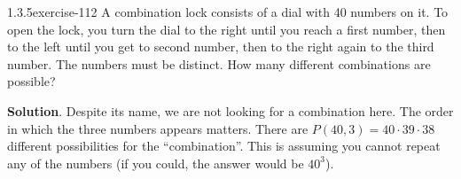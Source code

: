 \documentclass[twoside,11pt,]{book}
\numberwithin{equation}{chapter}
\begin{document}
\begin{divisionsolution}{1.3.5}{}{exercise-112}%
\hypertarget{p-1845}{}%
A combination lock consists of a dial with 40 numbers on it. To open the lock, you turn the dial to the right until you reach a first number, then to the left until you get to second number, then to the right again to the third number. The numbers must be distinct. How many different combinations are possible?%
\par\smallskip%
\noindent\textbf{Solution}.\quad%
\hypertarget{p-1847}{}%
Despite its name, we are not looking for a combination here. The order in which the three numbers appears matters. There are \(P(40,3) = 40\cdot 39 \cdot 38\) different possibilities for the ``combination''. This is assuming you cannot repeat any of the numbers (if you could, the answer would be \(40^3\)).%
\end{divisionsolution}%
\end{document}
